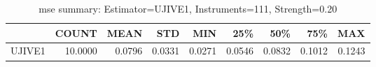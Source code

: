 \begin{table}[ht]
\centering
\caption{mse summary: Estimator=UJIVE1, Instruments=111, Strength=0.20}
\begin{tabular}{lrrrrrrrr}
\toprule
 & COUNT & MEAN & STD & MIN & 25\% & 50\% & 75\% & MAX \\
\midrule
UJIVE1 & 10.0000 & 0.0796 & 0.0331 & 0.0271 & 0.0546 & 0.0832 & 0.1012 & 0.1243 \\
\bottomrule
\end{tabular}
\end{table}
